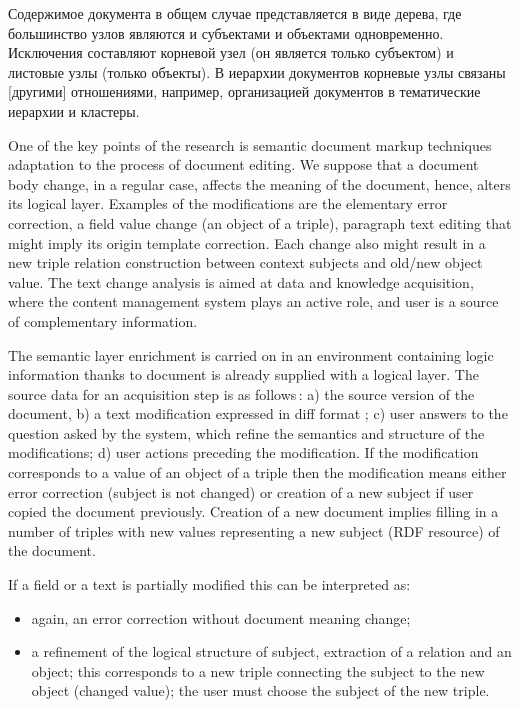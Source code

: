 \documentclass[utf8]{../IncArticle}
\newcommand{\e}[2][fcolor]{\textcolor{pcolor}{[}\textcolor{#1}{#2}\textcolor{pcolor}{]}}
\begin{document}
Содержимое документа в общем случае представляется в виде дерева, где
большинство узлов являются и субъектами и объектами
одновременно. Исключения составляют корневой узел (он является только
субъектом) и листовые узлы (только объекты).  В иерархии документов
корневые узлы связаны \e{другими} отношениями, например, организацией
документов в тематические иерархии и кластеры.



One of the key points of the research is semantic document markup techniques adaptation to the process of document editing.  We suppose that a document body change, in a regular case, affects the meaning of the document, hence, alters its logical layer.  Examples of the modifications are the elementary error correction, a field value change (an object of a triple), paragraph text editing that might imply its origin template correction.  Each change also might result in a new triple relation construction between context subjects and old/new object value.  The text change analysis is aimed at data and knowledge acquisition, where the content management system plays an active role, and user is a source of complementary information.

The semantic layer enrichment is carried on in an environment containing logic information thanks to document is already supplied with a logical layer.  The source data for an acquisition step is as follows\,: a) the source version of the document, b) a text modification expressed in diff format \cite{b9}; c) user answers to the question asked by the system, which refine the semantics and structure of the modifications; d) user actions preceding the modification.  If the modification corresponds to a value of an object of a triple then the modification means either error correction (subject is not changed) or creation of a new subject if user copied the document previously.  Creation of a new document implies filling in a number of triples with new values representing a new subject (RDF resource) of the document.

If a field or a text is partially modified this can be interpreted as:
\begin{itemize}
\item again, an error correction without document meaning change;
\item a refinement of the logical structure of subject, extraction of a relation and an object; this corresponds to a new triple connecting the subject to the new object (changed value); the user must choose the subject of the new triple.
\end{itemize}
\end{document}
